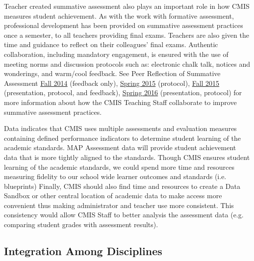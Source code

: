 \documentclass{report}
\begin{document}
\begin{findings}
Teacher created summative assessment also plays an important role in how CMIS measures student achievement. As with the work with formative assessment, professional development has been provided on summative assessment practices once a semester, to all teachers providing final exams. Teachers are also given the time and guidance to reflect on their colleagues’ final exams. Authentic collaboration, including mandatory engagement, is ensured with the use of meeting norms and discussion protocols such as: electronic chalk talk, notices and wonderings, and warm/cool feedback. See Peer Reflection of Summative Assessment \href{https://drive.google.com/a/cmis.ac.th/folderview?id=0ByVFfrm0zfolTHY0dmtURG5pcGs&usp=sharing}{Fall 2014} (feedback only), \href{https://drive.google.com/a/cmis.ac.th/folderview?id=0ByVFfrm0zfolaWQzeWxCTlVyUFU&usp=sharing}{Spring 2015} (protocol), \href{https://drive.google.com/a/cmis.ac.th/folderview?id=0ByVFfrm0zfolRjQzTDhmT0dyYzg&usp=sharing}{Fall 2015} (presentation, protocol, and feedback), \href{https://drive.google.com/a/cmis.ac.th/folderview?id=0ByVFfrm0zfolT29vQXpQeXp3VlU&usp=sharing}{Spring 2016} (presentation, protocol) for more information about how the CMIS Teaching Staff collaborate to improve summative assessment practices. 


Data indicates that CMIS uses multiple assessments and evaluation measures containing defined performance indicators to determine student learning of the academic standards. MAP Assessment data will provide student achievement data that is more tightly aligned to the standards. Though CMIS ensures student learning of the academic standards, we could spend more time and resources measuring fidelity to our school wide learner outcomes and standards (i.e. blueprints) Finally, CMIS should also find time and resources to create a Data Sandbox or other central location of academic data to make access more convenient thus making administrator and teacher use more consistent. This consistency would allow CMIS Staff to better analysis the assessment data (e.g. comparing student grades with assessment results). 
\end{findings}

\subsection{Integration Among Disciplines}

\end{document}
